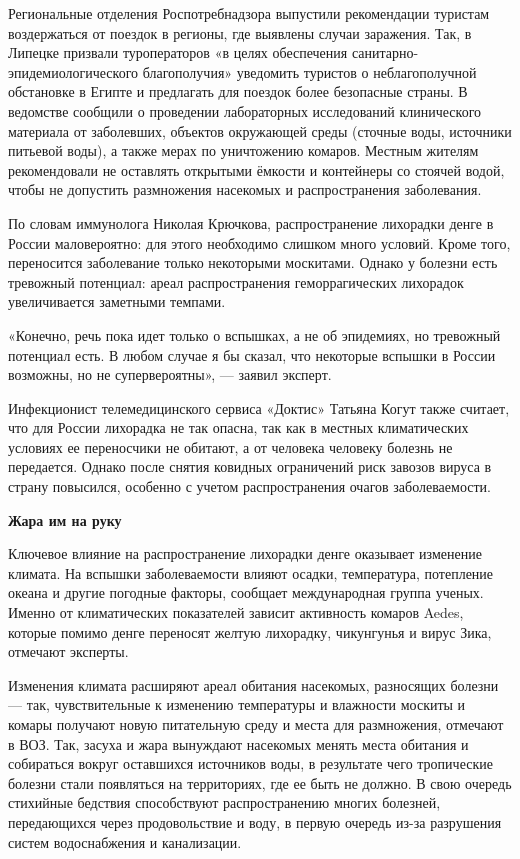 Региональные отделения Роспотребнадзора выпустили рекомендации туристам воздержаться от поездок в регионы, где выявлены случаи заражения. Так, в Липецке призвали туроператоров «в целях обеспечения санитарно-эпидемиологического благополучия» уведомить туристов о неблагополучной обстановке в Египте и предлагать для поездок более безопасные страны. В ведомстве сообщили о проведении лабораторных исследований клинического материала от заболевших, объектов окружающей среды (сточные воды, источники питьевой воды), а также мерах по уничтожению комаров. Местным жителям рекомендовали не оставлять открытыми ёмкости и контейнеры со стоячей водой, чтобы не допустить размножения насекомых и распространения заболевания.

По словам иммунолога Николая Крючкова, распространение лихорадки денге в России маловероятно: для этого необходимо слишком много условий. Кроме того, переносится заболевание только некоторыми москитами. Однако у болезни есть тревожный потенциал: ареал распространения геморрагических лихорадок увеличивается заметными темпами.

«Конечно, речь пока идет только о вспышках, а не об эпидемиях, но тревожный потенциал есть. В любом случае я бы сказал, что некоторые вспышки в России возможны, но не супервероятны», — заявил эксперт.

Инфекционист телемедицинского сервиса «Доктис» Татьяна Когут также считает, что для России лихорадка не так опасна, так как в местных климатических условиях ее переносчики не обитают, а от человека человеку болезнь не передается. Однако после снятия ковидных ограничений риск завозов вируса в страну повысился, особенно с учетом распространения очагов заболеваемости.


\textbf{Жара им на руку}

Ключевое влияние на распространение лихорадки денге оказывает изменение климата. На вспышки заболеваемости влияют осадки, температура, потепление океана и другие погодные факторы, сообщает международная группа ученых. Именно от климатических показателей зависит активность комаров Aedes, которые помимо денге переносят желтую лихорадку, чикунгунья и вирус Зика, отмечают эксперты.

Изменения климата расширяют ареал обитания насекомых, разносящих болезни — так, чувствительные к изменению температуры и влажности москиты и комары получают новую питательную среду и места для размножения, отмечают в ВОЗ. Так, засуха и жара вынуждают насекомых менять места обитания и собираться вокруг оставшихся источников воды, в результате чего тропические болезни стали появляться на территориях, где ее быть не должно. В свою очередь стихийные бедствия способствуют распространению многих болезней, передающихся через продовольствие и воду, в первую очередь из-за разрушения систем водоснабжения и канализации.

